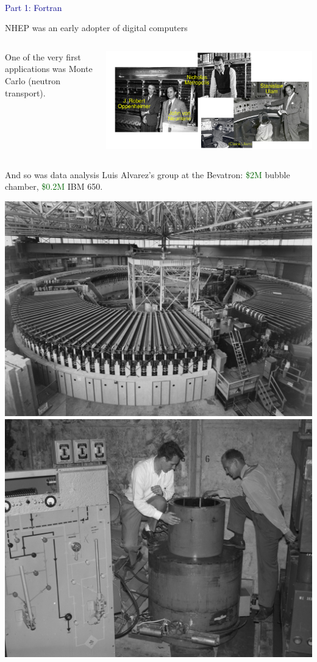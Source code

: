 \documentclass[aspectratio=169]{beamer}
\begin{document}
\begin{frame}{\mbox{ }}
\LARGE
\begin{center}
\textcolor{darkblue}{Part 1: Fortran}
\end{center}
\end{frame}

\begin{frame}{NHEP was an early adopter of digital computers}
\Large
\vspace{0.35 cm}
\begin{columns}
One of the very first applications was Monte Carlo (neutron transport).

\vspace{-0.2 cm}
\begin{center}
\includegraphics[width=\linewidth]{PLOTS/manhattan-project-physicists-and-computer.jpg}
\end{center}
\end{columns}
\end{frame}

\begin{frame}{And so was data analysis}
\large
\vspace{0.5 cm}
Luis Alvarez's group at the Bevatron: \textcolor{darkgreen}{\$2M} bubble chamber, \textcolor{darkgreen}{\$0.2M} IBM 650.

\vspace{0.5 cm}
\includegraphics[width=0.45\linewidth]{PLOTS/overall-view-of-bevatron-magnet-photograph-taken-september-6-1955-bevatron-088cb0-1600.jpg}\hfill\includegraphics[width=0.5\linewidth]{PLOTS/alvarez-group-bubble-chamber.jpg}
\end{frame}
\end{document}
